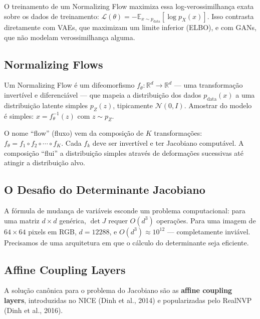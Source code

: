 \documentclass{tufte-handout}
\let\subsubsection\subsection
\begin{document}
O treinamento de um Normalizing Flow maximiza essa log-verossimilhança exata sobre os dados de treinamento: $\mathcal{L}(\theta) = -\mathbb{E}_{x \sim p_{\text{data}}}[\log p_X(x)]$. Isso contrasta diretamente com VAEs, que maximizam um limite inferior (ELBO), e com GANs, que não modelam verossimilhança alguma.

\subsection{Normalizing Flows}

\begin{defn}
Um Normalizing Flow é um difeomorfismo $f_\theta: \mathbb{R}^d \rightarrow \mathbb{R}^d$ --- uma transformação invertível e diferenciável --- que mapeia a distribuição dos dados $p_{\text{data}}(x)$ a uma distribuição latente simples $p_Z(z)$, tipicamente $\mathcal{N}(0, I)$. Amostrar do modelo é simples: $x = f_\theta^{-1}(z)$ com $z \sim p_Z$.
\end{defn}

O nome ``flow'' (fluxo) vem da composição de $K$ transformações: $f_\theta = f_1 \circ f_2 \circ \cdots \circ f_K$. Cada $f_k$ deve ser invertível e ter Jacobiano computável. A composição ``flui'' a distribuição simples através de deformações sucessivas até atingir a distribuição alvo.

\subsubsection{O Desafio do Determinante Jacobiano}

A fórmula de mudança de variáveis esconde um problema computacional: para uma matriz $d \times d$ genérica, $\det J$ requer $O(d^3)$ operações. Para uma imagem de $64 \times 64$ pixels em RGB, $d = 12288$, e $O(d^3) \approx 10^{12}$ --- completamente inviável. Precisamos de uma arquitetura em que o cálculo do determinante seja eficiente.

\subsection{Affine Coupling Layers}

A solução canônica para o problema do Jacobiano são as \textbf{affine coupling layers}, introduzidas no NICE (Dinh et al., 2014) e popularizadas pelo RealNVP (Dinh et al., 2016).
\end{document}
